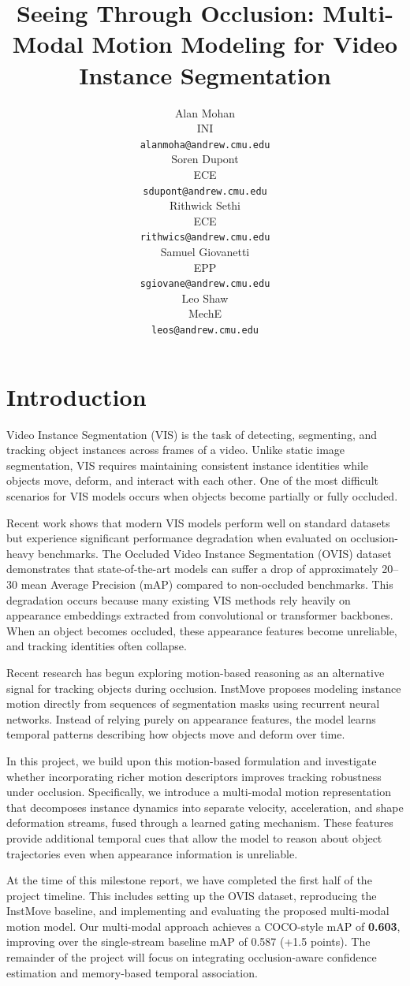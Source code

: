\documentclass{article}
\title{Seeing Through Occlusion: Multi-Modal Motion Modeling for Video Instance Segmentation}
\author{%
  Alan Mohan \\
  INI \\
  \texttt{alanmoha@andrew.cmu.edu} \\
  \And
  Soren Dupont \\
  ECE \\
  \texttt{sdupont@andrew.cmu.edu} \\
  \And
  Rithwick Sethi \\
  ECE \\
  \texttt{rithwics@andrew.cmu.edu} \\
  \And
  Samuel Giovanetti \\
  EPP \\
  \texttt{sgiovane@andrew.cmu.edu} \\
  \And
  Leo Shaw \\
  MechE \\
  \texttt{leos@andrew.cmu.edu} \\
}
\begin{document}
\maketitle

\section{Introduction}

Video Instance Segmentation (VIS) is the task of detecting, segmenting, and tracking object instances across frames of a video. Unlike static image segmentation, VIS requires maintaining consistent instance identities while objects move, deform, and interact with each other. One of the most difficult scenarios for VIS models occurs when objects become partially or fully occluded.

Recent work shows that modern VIS models perform well on standard datasets but experience significant performance degradation when evaluated on occlusion-heavy benchmarks. The Occluded Video Instance Segmentation (OVIS) dataset \cite{qi2022ovis} demonstrates that state-of-the-art models can suffer a drop of approximately 20--30 mean Average Precision (mAP) compared to non-occluded benchmarks. This degradation occurs because many existing VIS methods rely heavily on appearance embeddings extracted from convolutional or transformer backbones. When an object becomes occluded, these appearance features become unreliable, and tracking identities often collapse.

Recent research has begun exploring motion-based reasoning as an alternative signal for tracking objects during occlusion. InstMove \cite{liu2023instmove} proposes modeling instance motion directly from sequences of segmentation masks using recurrent neural networks. Instead of relying purely on appearance features, the model learns temporal patterns describing how objects move and deform over time.

In this project, we build upon this motion-based formulation and investigate whether incorporating richer motion descriptors improves tracking robustness under occlusion. Specifically, we introduce a multi-modal motion representation that decomposes instance dynamics into separate velocity, acceleration, and shape deformation streams, fused through a learned gating mechanism. These features provide additional temporal cues that allow the model to reason about object trajectories even when appearance information is unreliable.

At the time of this milestone report, we have completed the first half of the project timeline. This includes setting up the OVIS dataset, reproducing the InstMove baseline, and implementing and evaluating the proposed multi-modal motion model. Our multi-modal approach achieves a COCO-style mAP of \textbf{0.603}, improving over the single-stream baseline mAP of 0.587 (+1.5 points). The remainder of the project will focus on integrating occlusion-aware confidence estimation and memory-based temporal association.
\end{document}
